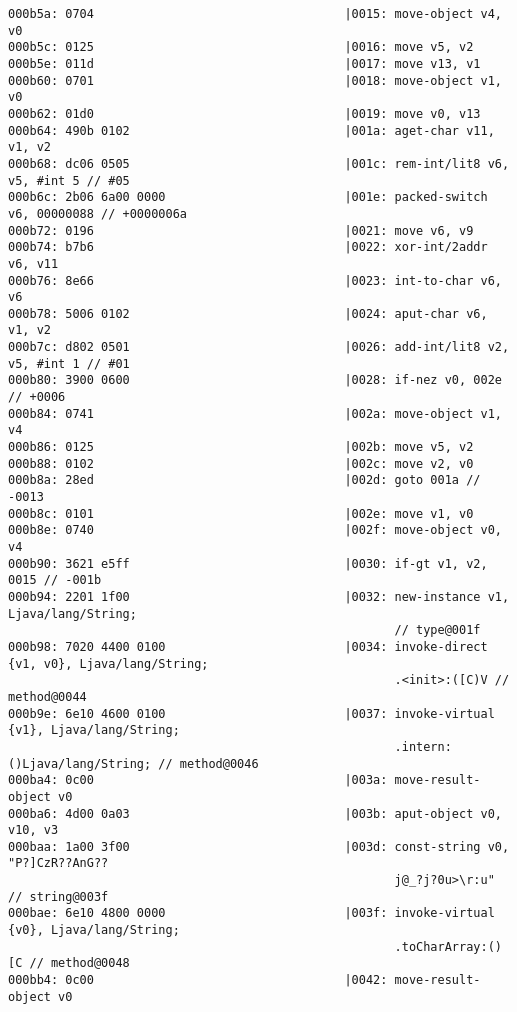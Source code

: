 \begin{lstlisting}
000b5a: 0704                                   |0015: move-object v4, v0
000b5c: 0125                                   |0016: move v5, v2
000b5e: 011d                                   |0017: move v13, v1
000b60: 0701                                   |0018: move-object v1, v0
000b62: 01d0                                   |0019: move v0, v13
000b64: 490b 0102                              |001a: aget-char v11, v1, v2
000b68: dc06 0505                              |001c: rem-int/lit8 v6, v5, #int 5 // #05
000b6c: 2b06 6a00 0000                         |001e: packed-switch v6, 00000088 // +0000006a
000b72: 0196                                   |0021: move v6, v9
000b74: b7b6                                   |0022: xor-int/2addr v6, v11
000b76: 8e66                                   |0023: int-to-char v6, v6
000b78: 5006 0102                              |0024: aput-char v6, v1, v2
000b7c: d802 0501                              |0026: add-int/lit8 v2, v5, #int 1 // #01
000b80: 3900 0600                              |0028: if-nez v0, 002e // +0006
000b84: 0741                                   |002a: move-object v1, v4
000b86: 0125                                   |002b: move v5, v2
000b88: 0102                                   |002c: move v2, v0
000b8a: 28ed                                   |002d: goto 001a // -0013
000b8c: 0101                                   |002e: move v1, v0
000b8e: 0740                                   |002f: move-object v0, v4
000b90: 3621 e5ff                              |0030: if-gt v1, v2, 0015 // -001b
000b94: 2201 1f00                              |0032: new-instance v1, Ljava/lang/String;
                                                      // type@001f
000b98: 7020 4400 0100                         |0034: invoke-direct {v1, v0}, Ljava/lang/String;
                                                      .<init>:([C)V // method@0044
000b9e: 6e10 4600 0100                         |0037: invoke-virtual {v1}, Ljava/lang/String;
                                                      .intern:()Ljava/lang/String; // method@0046
000ba4: 0c00                                   |003a: move-result-object v0
000ba6: 4d00 0a03                              |003b: aput-object v0, v10, v3
000baa: 1a00 3f00                              |003d: const-string v0, "P?]CzR??AnG??
                                                      j@_?j?0u>\r:u" // string@003f
000bae: 6e10 4800 0000                         |003f: invoke-virtual {v0}, Ljava/lang/String;
                                                      .toCharArray:()[C // method@0048
000bb4: 0c00                                   |0042: move-result-object v0

\end{lstlisting}
